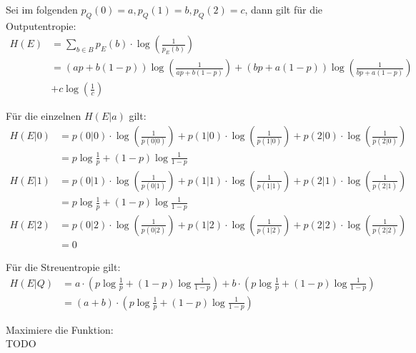 \begin{myList}
Sei im folgenden $p_Q(0) = a, p_Q(1) = b, p_Q(2) = c$, dann gilt für die Outputentropie:
\begin{align*}
	H(E) &= \sum\limits_{b \in B} p_E(b) \cdot \log \left( \frac{1}{p_E(b)} \right)\\
	&= (ap + b(1-p))\log \left(\frac{1}{ap + b(1-p)}\right) + (bp + a(1-p))\log \left(\frac{1}{bp + a(1-p)}\right)\\
	&+ c \log\left( \frac{1}{c} \right)
\end{align*}

Für die einzelnen $H(E|a)$ gilt:
\begin{align*}
	H(E|0) &= p(0|0) \cdot \log \left(\frac{1}{p(0|0)} \right) + p(1|0) \cdot \log \left(\frac{1}{p(1|0)} \right) + p(2|0) \cdot \log \left(\frac{1}{p(2|0)} \right)\\
	&= p\log \frac{1}{p} + (1-p) \log \frac{1}{1-p}\\
	H(E|1) &= p(0|1) \cdot \log \left(\frac{1}{p(0|1)} \right) + p(1|1) \cdot \log \left(\frac{1}{p(1|1)} \right) + p(2|1) \cdot \log \left(\frac{1}{p(2|1)} \right)\\
	&= p\log \frac{1}{p} + (1-p) \log \frac{1}{1-p}\\
	H(E|2) &= p(0|2) \cdot \log \left(\frac{1}{p(0|2)} \right) + p(1|2) \cdot \log \left(\frac{1}{p(1|2)} \right) + p(2|2) \cdot \log \left(\frac{1}{p(2|2)} \right) \\
	&= 0
\end{align*}

Für die Streuentropie gilt:
\begin{align*}
	H(E|Q) &= a \cdot (p\log \frac{1}{p} + (1-p) \log \frac{1}{1-p}) + b \cdot (p\log \frac{1}{p} + (1-p) \log \frac{1}{1-p}) \\
	&= (a+b) \cdot (p\log \frac{1}{p} + (1-p) \log \frac{1}{1-p})
\end{align*}

Maximiere die Funktion:\\
TODO
\end{myList}

